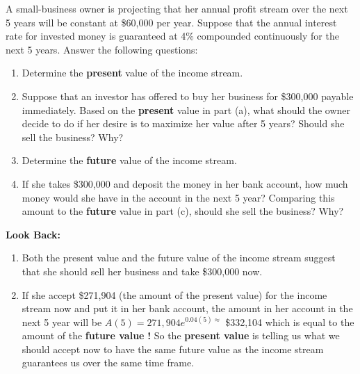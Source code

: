 \begin{example}
A small-business owner is projecting that her annual profit stream over the next 5 years will be constant at \$60,000 per year.  Suppose that the annual interest rate for invested money is guaranteed at 4\% compounded continuously for the next 5 years. Answer the following questions:
\renewcommand{\labelenumi}{\textbf{(\alph{enumi})}}
    \begin{enumerate}[leftmargin=*]
    \item Determine the \textbf{present} value of the income stream. 
    \newpage
    \item Suppose that an investor has offered to buy her business for \$300,000 payable immediately.  Based on the \textbf{present} value in part (a),   what should the owner decide to do if her desire is to maximize her value after 5 years? Should she sell the business? Why?
    \item Determine the \textbf{future} value of the income stream. 
    \item If she takes \$300,000 and deposit the money in her bank account, how much money would she have in the account in the next 5 year? Comparing this amount to  the \textbf{future} value in part (c), should she sell the business? Why? 
    \end{enumerate}
\vspace*{\fill}
\noindent \textbf{Look Back:}
\renewcommand{\labelenumi}{\textbf{(\arabic{enumi})}}
\begin{enumerate}[leftmargin=*]
\item Both the present value and the future value of the income stream suggest that she should sell her business and take \$300,000 now.
\item If she accept \$271,904 (the amount of the present value) for the income stream now and put it in her bank account, the amount in her account in the next 5 year will be $A(5)=271,904e^{0.04(5)\approx}$ \$332,104 which is equal to the amount of the \textbf{future value} \textbf{!} So the \textbf{present value} is telling us what we should accept now to have the same future value as the income stream guarantees us over the same time frame.
\end{enumerate}

\end{example}
